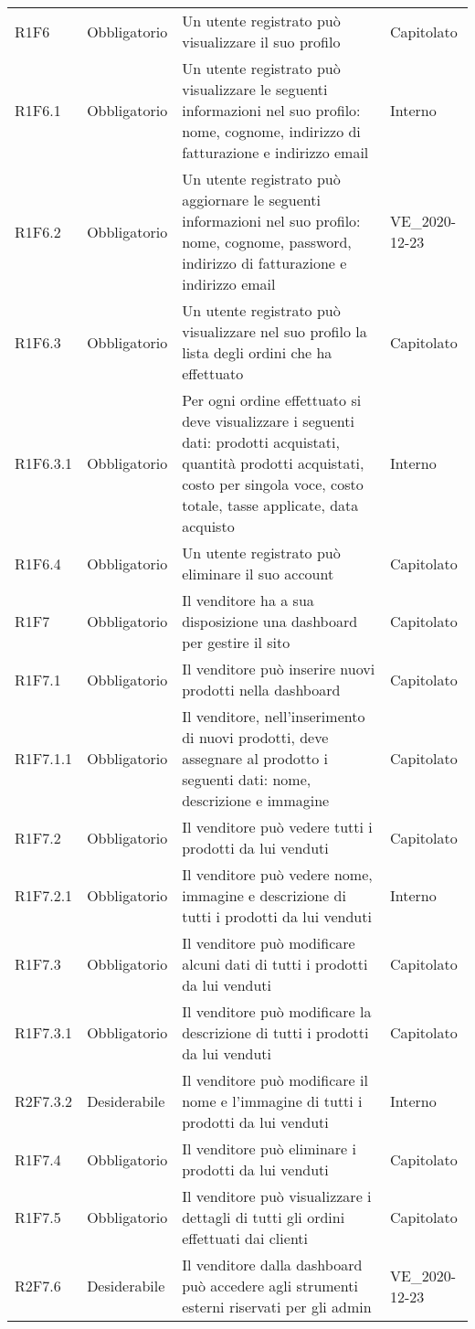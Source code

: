 {\begin{longtable}{C{2.5cm} C{2.8cm} C{6.7cm} C{2.5cm}}
R1F6 & Obbligatorio & Un utente registrato può visualizzare il suo profilo & Capitolato \\
R1F6.1 & Obbligatorio & Un utente registrato può visualizzare le seguenti informazioni nel suo profilo: nome, cognome, indirizzo di fatturazione e indirizzo email & Interno \\
R1F6.2 & Obbligatorio & Un utente registrato può aggiornare le seguenti informazioni nel suo profilo: nome, cognome, password, indirizzo di fatturazione e indirizzo email & VE\_2020-12-23 \\
R1F6.3 & Obbligatorio & Un utente registrato può visualizzare nel suo profilo la lista degli ordini che ha effettuato & Capitolato \\
R1F6.3.1 & Obbligatorio & Per ogni ordine effettuato si deve visualizzare i seguenti dati: prodotti acquistati, quantità prodotti acquistati, costo per singola voce, costo totale, tasse applicate, data acquisto & Interno \\
R1F6.4 & Obbligatorio & Un utente registrato può eliminare il suo account & Capitolato \\


R1F7 & Obbligatorio & Il venditore ha a sua disposizione una dashboard per gestire il sito & Capitolato \\
R1F7.1 & Obbligatorio & Il venditore può inserire nuovi prodotti nella dashboard & Capitolato \\
R1F7.1.1 & Obbligatorio & Il venditore, nell'inserimento di nuovi prodotti, deve assegnare al prodotto i seguenti dati: nome, descrizione e immagine & Capitolato \\
R1F7.2 & Obbligatorio & Il venditore può vedere tutti i prodotti da lui venduti & Capitolato \\
R1F7.2.1 & Obbligatorio & Il venditore può vedere nome, immagine e descrizione di tutti i prodotti da lui venduti & Interno \\
R1F7.3 & Obbligatorio & Il venditore può modificare alcuni dati di tutti i prodotti da lui venduti & Capitolato \\
R1F7.3.1 & Obbligatorio & Il venditore può modificare la descrizione di tutti i prodotti da lui venduti & Capitolato \\
R2F7.3.2 & Desiderabile & Il venditore può modificare il nome e l'immagine di tutti i prodotti da lui venduti & Interno \\
R1F7.4 & Obbligatorio & Il venditore può eliminare i prodotti da lui venduti & Capitolato \\
R1F7.5 & Obbligatorio & Il venditore può visualizzare i dettagli di tutti gli ordini effettuati dai clienti & Capitolato \\
R2F7.6 & Desiderabile & Il venditore dalla dashboard può accedere agli strumenti esterni riservati per gli admin & VE\_2020-12-23 \\


\end{longtable}}

